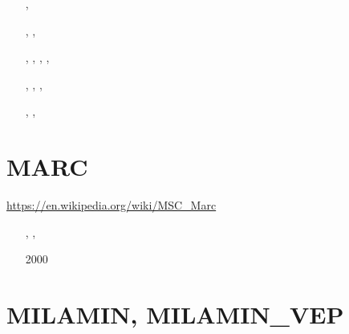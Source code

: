 \begin{small}
\begin{itemize}
\item[\twothousandtwelve]    \textcite{yatd12}
\item[\twothousandthirteen]  \textcite{yahb13}
\item[\twothousandfifteen]   \textcite{yadm15}
\item[\twothousandsixteen]   \textcite{dumy16},  \textcite{dupm16}
\item[\twothousandnineteen]  \textcite{chmd19},  \textcite{dual19},  \textcite{pedm19}
\item[\twothousandtwenty]    \textcite{poyd20},  \textcite{bedh20},  \textcite{casd20}, 
                             \textcite{chsm20},  \textcite{auwy20}
\item[\twothousandtwentyone] \textcite{pody21},  \textcite{cadm21},  \textcite{auwy21},
                             \textcite{poyd21}
\item[\twothousandtwentytwo] \textcite{auyd22},  \textcite{yadb22},  \textcite{cads22}
\end{itemize}
\end{small}



\section{MARC}

\url{https://en.wikipedia.org/wiki/MSC_Marc}

\begin{small}
\begin{itemize}
\item[\nineteenninetyseven] \textcite{nesg97}
\item[\nineteenninetynine]  \textcite{nesb99}, \textcite{nebc99}, \textcite{dins99}
\item[2000]  \textcite{gacn00}
\end{itemize}
\end{small}

\section{MILAMIN, MILAMIN\_VEP} 

